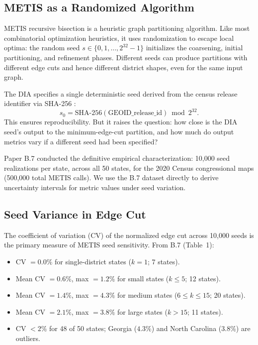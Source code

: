
\subsection{METIS as a Randomized Algorithm}

METIS recursive bisection \citep{karypis1998} is a heuristic graph
partitioning algorithm. Like most combinatorial optimization heuristics,
it uses randomization to escape local optima: the random seed
$s \in \{0, 1, \ldots, 2^{32}-1\}$ initializes the coarsening,
initial partitioning, and refinement phases. Different seeds can produce
partitions with different edge cuts and hence different district shapes,
even for the same input graph.

The DIA \citep{b02paper} specifies a single deterministic seed derived
from the census release identifier via SHA-256 \citep{sha256nist}:
\begin{equation}
  s_0 = \text{SHA-256}(\text{GEOID\_release\_id}) \bmod 2^{32}.
\end{equation}
This ensures reproducibility. But it raises the question: how close is
the DIA seed's output to the minimum-edge-cut partition, and how much
do output metrics vary if a different seed had been specified?

Paper B.7 \citep{b7paper} conducted the definitive empirical
characterization: 10,000 seed realizations per state, across all 50
states, for the 2020 Census congressional maps (500,000 total METIS
calls). We use the B.7 dataset directly to derive uncertainty intervals
for metric values under seed variation.

\subsection{Seed Variance in Edge Cut}

The coefficient of variation (CV) of the normalized edge cut across
10,000 seeds is the primary measure of METIS seed sensitivity. From
B.7 (Table~1):
\begin{itemize}
  \item CV $= 0.0\%$ for single-district states ($k = 1$; 7 states).
  \item Mean CV $= 0.6\%$, max $= 1.2\%$ for small states ($k \leq 5$;
    12 states).
  \item Mean CV $= 1.4\%$, max $= 4.3\%$ for medium states
    ($6 \leq k \leq 15$; 20 states).
  \item Mean CV $= 2.1\%$, max $= 3.8\%$ for large states ($k > 15$;
    11 states).
  \item CV $< 2\%$ for 48 of 50 states; Georgia ($4.3\%$) and
    North Carolina ($3.8\%$) are outliers.
\end{itemize}

